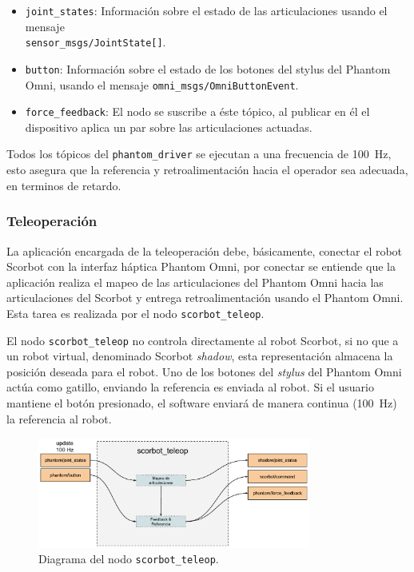 \begin{itemize}
\item \texttt{joint\_states}: Información sobre el estado de las articulaciones usando el mensaje \\ \texttt{sensor\_msgs/JointState[]}.

\item \texttt{button}: Información sobre el estado de los botones del stylus del Phantom Omni, usando el mensaje \texttt{omni\_msgs/OmniButtonEvent}.

\item \texttt{force\_feedback}: El nodo se suscribe a éste tópico, al publicar en él el dispositivo aplica un par sobre las articulaciones actuadas.
\end{itemize}

Todos los tópicos del \texttt{phantom\_driver} se ejecutan a una frecuencia de \SI{100}{\hertz}, esto asegura que la referencia y retroalimentación hacia el operador sea adecuada, en terminos de retardo.


\subsubsection{Teleoperación}

La aplicación encargada de la teleoperación debe, básicamente, conectar el robot Scorbot con la interfaz háptica Phantom Omni, por conectar se entiende que la aplicación realiza el mapeo de las articulaciones del Phantom Omni hacia las articulaciones del Scorbot y entrega retroalimentación usando el Phantom Omni. Esta tarea es realizada por el nodo \texttt{scorbot\_teleop}.

El nodo \texttt{scorbot\_teleop} no controla directamente al robot Scorbot, si no que a un robot virtual, denominado Scorbot \textit{shadow}, esta representación almacena la posición deseada para el robot. Uno de los botones del \textit{stylus} del Phantom Omni actúa como gatillo, enviando la referencia es enviada al robot. Si el usuario mantiene el botón presionado, el software enviará de manera continua (\SI{100}{\hertz}) la referencia al robot.

\begin{figure}[H]
  \centering
  \includegraphics[width=0.8\textwidth]{img/cap4/scorbot_teleop.pdf}
  \caption{Diagrama del nodo \texttt{scorbot\_teleop}.}
  \label{cap4_scorbot_teleop}
\end{figure}

